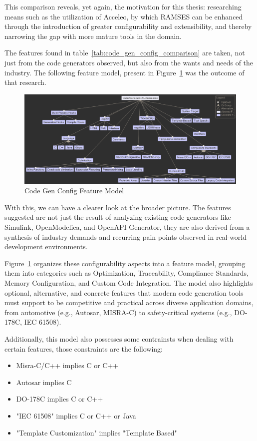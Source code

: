 This comparison reveals, yet again, the motivation for this thesis: researching means such as the utilization of Acceleo, by which RAMSES can be enhanced through the introduction of greater configurability and extensibility, and thereby narrowing the gap with more mature tools in the domain.

The features found in table~\ref{tab:code_gen_config_comparison} are taken, not just from the code generators observed, but also from the wants and needs of the industry. The following feature model, present in Figure~\ref{fig:feature_model} was the outcome of that research.

\begin{figure}[htbp]
	\centering
	\includegraphics[height=0.4\textwidth]{featureModel.png}
	\caption{Code Gen Config Feature Model}
	\label{fig:feature_model}
\end{figure}

With this, we can have a clearer look at the broader picture. The features suggested are not just the result of analyzing existing code generators like Simulink, OpenModelica, and OpenAPI Generator, they are also derived from a synthesis of industry demands and recurring pain points observed in real-world development environments.

Figure~\ref{fig:feature_model} organizes these configurability aspects into a feature model, grouping them into categories such as Optimization, Traceability, Compliance Standards, Memory Configuration, and Custom Code Integration. The model also highlights optional, alternative, and concrete features that modern code generation tools must support to be competitive and practical across diverse application domains, from automotive (e.g., Autosar, MISRA-C) to safety-critical systems (e.g., DO-178C, IEC 61508).

Additionally, this model also possesses some contrainsts when dealing with certain features, those constraints are the following:

\begin{itemize} 
	\item Misra-C/C++ implies C or C++
	\item Autosar implies C
	\item DO-178C implies C or C++
	\item "IEC 61508" implies C or C++ or Java
	\item "Template Customization" implies "Template Based"
\end{itemize}


